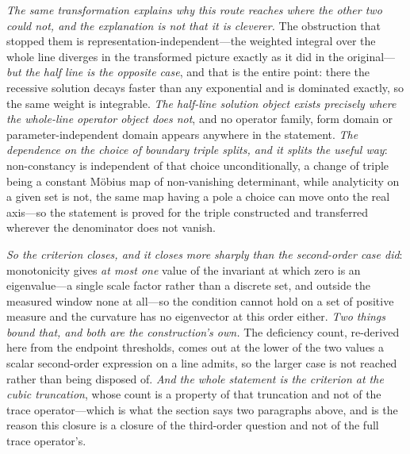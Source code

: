 \documentclass[11pt,a4paper]{article}
\theoremstyle{plain}
\theoremstyle{definition}
\theoremstyle{remark}
\begin{document}
\emph{The same transformation explains why this route reaches where the other two could not, and the
explanation is not that it is cleverer.} The obstruction that stopped them is representation-independent---the
weighted integral over the whole line diverges in the transformed picture exactly as it did in the
original---\emph{but the half line is the opposite case}, and that is the entire point: there the recessive
solution decays faster than any exponential and is dominated exactly, so the same weight is integrable.
\emph{The half-line solution object exists precisely where the whole-line operator object does not}, and no
operator family, form domain or parameter-independent domain appears anywhere in the statement. \emph{The
dependence on the choice of boundary triple splits, and it splits the useful way}: non-constancy is
independent of that choice unconditionally, a change of triple being a constant M\"obius map of
non-vanishing determinant, while analyticity on a given set is not, the same map having a pole a choice can
move onto the real axis---so the statement is proved for the triple constructed and transferred wherever the
denominator does not vanish.

\emph{So the criterion closes, and it closes more sharply than the second-order case did}: monotonicity
gives \emph{at most one} value of the invariant at which zero is an eigenvalue---a single scale factor
rather than a discrete set, and outside the measured window none at all---so the condition cannot hold on a
set of positive measure and the curvature has no eigenvector at this order either. \emph{Two things bound
that, and both are the construction's own.} The deficiency count, re-derived here from the endpoint
thresholds, comes out at the lower of the two values a scalar second-order expression on a line admits, so
the larger case is not reached rather than being disposed of. \emph{And the whole statement is the criterion
at the cubic truncation}, whose count is a property of that truncation and not of the trace operator---which
is what the section says two paragraphs above, and is the reason this closure is a closure of the
third-order question and not of the full trace operator's.
\end{document}
